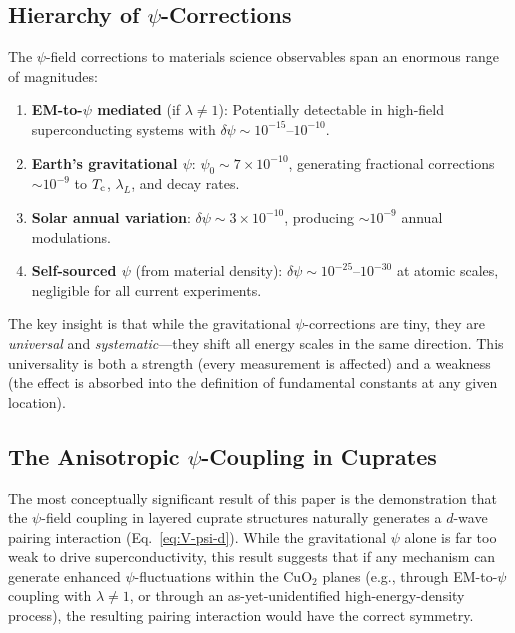 \documentclass[aps,prb,twocolumn,superscriptaddress,floatfix,nofootinbib,longbibliography]{revtex4-2}
\newcommand{\Tc}{T_{\rm c}}
\begin{document}
\subsection{Hierarchy of $\psi$-Corrections}

The $\psi$-field corrections to materials science observables span an
enormous range of magnitudes:

\begin{enumerate}[nosep]
\item \textbf{EM-to-$\psi$ mediated} (if $\lambda \neq 1$): Potentially
  detectable in high-field superconducting systems with
  $\delta\psi \sim 10^{-15}$--$10^{-10}$.
\item \textbf{Earth's gravitational $\psi$}: $\psi_0 \sim 7\times 10^{-10}$,
  generating fractional corrections $\sim 10^{-9}$ to $\Tc$, $\lambda_L$,
  and decay rates.
\item \textbf{Solar annual variation}: $\delta\psi \sim 3\times 10^{-10}$,
  producing $\sim 10^{-9}$ annual modulations.
\item \textbf{Self-sourced $\psi$} (from material density):
  $\delta\psi \sim 10^{-25}$--$10^{-30}$ at atomic scales, negligible for
  all current experiments.
\end{enumerate}

The key insight is that while the gravitational $\psi$-corrections are
tiny, they are \emph{universal} and \emph{systematic}---they shift all
energy scales in the same direction.  This universality is both a
strength (every measurement is affected) and a weakness (the effect is
absorbed into the definition of fundamental constants at any given
location).

\subsection{The Anisotropic $\psi$-Coupling in Cuprates}

The most conceptually significant result of this paper is the
demonstration that the $\psi$-field coupling in layered cuprate
structures naturally generates a $d$-wave pairing interaction
(Eq.~\ref{eq:V-psi-d}).  While the gravitational $\psi$ alone is
far too weak to drive superconductivity, this result suggests that
if any mechanism can generate enhanced $\psi$-fluctuations within the
CuO$_2$ planes (e.g., through EM-to-$\psi$ coupling with
$\lambda \neq 1$, or through an as-yet-unidentified high-energy-density
process), the resulting pairing interaction would have the correct
symmetry.
\end{document}
